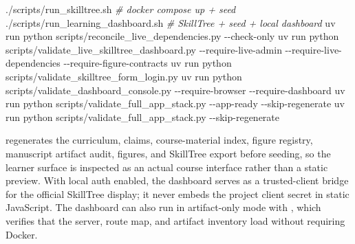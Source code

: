 \documentclass[
  english,
]{article}
\newenvironment{Shaded}{}{}
\newcommand{\AttributeTok}[1]{\textcolor[rgb]{0.49,0.56,0.16}{#1}}
\newcommand{\CommentTok}[1]{\textcolor[rgb]{0.38,0.63,0.69}{\textit{#1}}}
\newcommand{\ExtensionTok}[1]{#1}
\newcommand{\NormalTok}[1]{#1}
\begin{document}
\begin{Shaded}
\begin{Highlighting}[]
\ExtensionTok{./scripts/run\_skilltree.sh}                  \CommentTok{\# docker compose up + seed}
\ExtensionTok{./scripts/run\_learning\_dashboard.sh}         \CommentTok{\# SkillTree + seed + local dashboard}
\ExtensionTok{uv}\NormalTok{ run python scripts/reconcile\_live\_dependencies.py }\AttributeTok{{-}{-}check{-}only}
\ExtensionTok{uv}\NormalTok{ run python scripts/validate\_live\_skilltree\_dashboard.py }\AttributeTok{{-}{-}require{-}live{-}admin} \AttributeTok{{-}{-}require{-}live{-}dependencies} \AttributeTok{{-}{-}require{-}figure{-}contracts}
\ExtensionTok{uv}\NormalTok{ run python scripts/validate\_skilltree\_form\_login.py}
\ExtensionTok{uv}\NormalTok{ run python scripts/validate\_dashboard\_console.py }\AttributeTok{{-}{-}require{-}browser} \AttributeTok{{-}{-}require{-}dashboard}
\ExtensionTok{uv}\NormalTok{ run python scripts/validate\_full\_app\_stack.py }\AttributeTok{{-}{-}app{-}ready} \AttributeTok{{-}{-}skip{-}regenerate}
\ExtensionTok{uv}\NormalTok{ run python scripts/validate\_full\_app\_stack.py }\AttributeTok{{-}{-}skip{-}regenerate}
\end{Highlighting}
\end{Shaded}

 regenerates the curriculum, claims,
course-material index, figure registry, manuscript artifact audit,
figures, and SkillTree export before seeding, so the learner surface is
inspected as an actual course interface rather than a static preview.
With local auth enabled, the dashboard serves
 as a trusted-client
bridge for the official SkillTree display; it never embeds the project
client secret in static JavaScript. The dashboard can also run in
artifact-only mode with
,
which verifies that the server, route map, and artifact inventory load
without requiring Docker.
\end{document}
